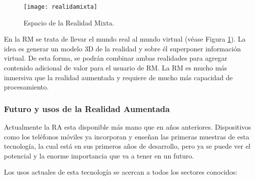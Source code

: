 \begin{figure}[h]
    \centering
    \texttt{[image: realidamixta]}
    \caption{ Espacio de la Realidad Mixta. }
    \label{fig:realidadMixta}
\end{figure}

En la RM se trata de llevar el mundo real al mundo virtual (véase Figura \ref{fig:realidadMixta}). La idea es generar un modelo 3D de la realidad y sobre él superponer información virtual. De esta forma, se podrán combinar ambas realidades para agregar contenido adicional de valor para el usuario de RM. La RM es mucho más inmersiva que la realidad aumentada y requiere de mucho más capacidad de procesamiento. 

\subsubsection{Futuro y usos de la Realidad Aumentada}
Actualmente la RA esta disponible más mano que en años anteriores. Dispositivos como los teléfonos móviles ya incorporan y enseñan las primeras muestras de esta tecnología, la cual está en sus primeros años de desarrollo, pero ya se puede ver el potencial y la enorme importancia que va a tener en un futuro.

Los usos actuales de esta tecnología se acercan a todos los sectores conocidos:

